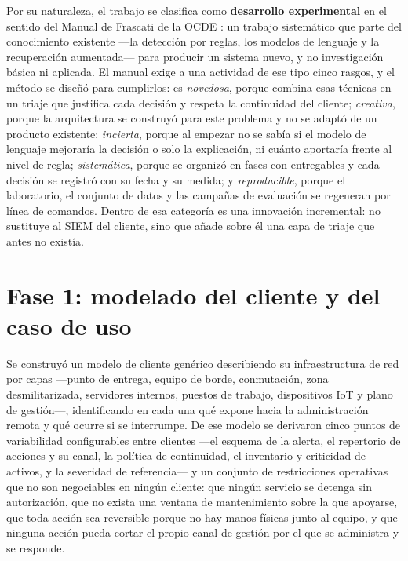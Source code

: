 Por su naturaleza, el trabajo se clasifica como \textbf{desarrollo experimental} en el sentido del
Manual de Frascati de la OCDE \cite{frascati2015}: un trabajo sistemático que parte del conocimiento
existente ---la detección por reglas, los modelos de lenguaje y la recuperación aumentada--- para
producir un sistema nuevo, y no investigación básica ni aplicada. El manual exige a una actividad de
ese tipo cinco rasgos, y el método se diseñó para cumplirlos: es \emph{novedosa}, porque combina esas
técnicas en un triaje que justifica cada decisión y respeta la continuidad del cliente;
\emph{creativa}, porque la arquitectura se construyó para este problema y no se adaptó de un producto
existente; \emph{incierta}, porque al empezar no se sabía si el modelo de lenguaje mejoraría la
decisión o solo la explicación, ni cuánto aportaría frente al nivel de regla; \emph{sistemática},
porque se organizó en fases con entregables y cada decisión se registró con su fecha y su medida; y
\emph{reproducible}, porque el laboratorio, el conjunto de datos y las campañas de evaluación se
regeneran por línea de comandos. Dentro de esa categoría es una innovación incremental: no sustituye
al SIEM del cliente, sino que añade sobre él una capa de triaje que antes no existía.

\section{Fase 1: modelado del cliente y del caso de uso}

Se construyó un modelo de cliente genérico describiendo su infraestructura de red por capas ---punto
de entrega, equipo de borde, conmutación, zona desmilitarizada, servidores internos, puestos de
trabajo, dispositivos IoT y plano de gestión---, identificando en cada una qué expone hacia la
administración remota y qué ocurre si se interrumpe. De ese modelo se derivaron cinco puntos de
variabilidad configurables entre clientes ---el esquema de la alerta, el repertorio de acciones y su
canal, la política de continuidad, el inventario y criticidad de activos, y la severidad de
referencia--- y un conjunto de restricciones operativas que no son negociables en ningún cliente:
que ningún servicio se detenga sin autorización, que no exista una ventana de mantenimiento sobre
la que apoyarse, que toda acción sea reversible porque no hay manos físicas junto al equipo, y que
ninguna acción pueda cortar el propio canal de gestión por el que se administra y se responde.

